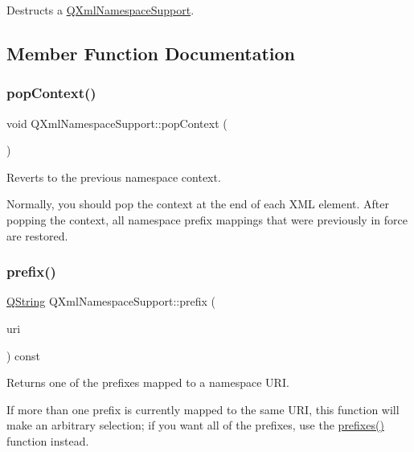 Destructs a \mbox{\hyperlink{class_q_xml_namespace_support}{Q\+Xml\+Namespace\+Support}}. 

\subsection{Member Function Documentation}
\mbox{\label{class_q_xml_namespace_support_ab36c81f4e2e0be48ba2b4ac23e67a578}} 
\subsubsection{\texorpdfstring{popContext()}{popContext()}}
{\footnotesize\ttfamily void Q\+Xml\+Namespace\+Support\+::pop\+Context (\begin{DoxyParamCaption}{ }\end{DoxyParamCaption})}

Reverts to the previous namespace context.

Normally, you should pop the context at the end of each X\+ML element. After popping the context, all namespace prefix mappings that were previously in force are restored. \mbox{\label{class_q_xml_namespace_support_a3799ab420cf2a762eb74929fdf5707e5}} 
\subsubsection{\texorpdfstring{prefix()}{prefix()}}
{\footnotesize\ttfamily \mbox{\hyperlink{class_q_string}{Q\+String}} Q\+Xml\+Namespace\+Support\+::prefix (\begin{DoxyParamCaption}\item[{const \mbox{\hyperlink{class_q_string}{Q\+String}} \&}]{uri }\end{DoxyParamCaption}) const}

Returns one of the prefixes mapped to a namespace U\+RI.

If more than one prefix is currently mapped to the same U\+RI, this function will make an arbitrary selection; if you want all of the prefixes, use the \mbox{\hyperlink{class_q_xml_namespace_support_a502bb683754cbb33cbd4ea53283e6f79}{prefixes()}} function instead.

